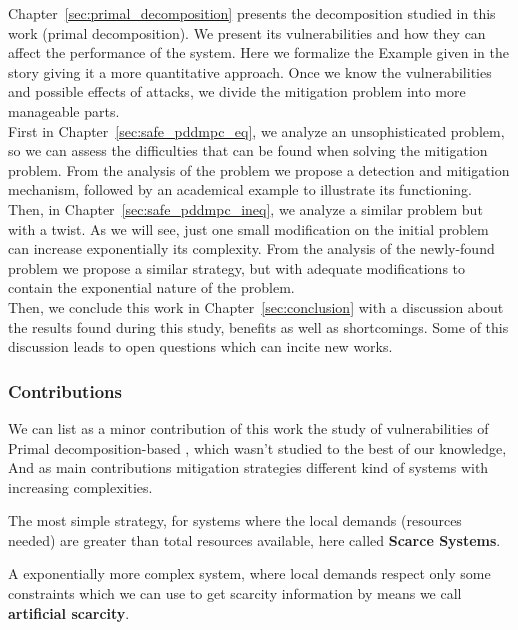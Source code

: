 \documentclass[../main.tex]{subfiles}
\begin{document}
Chapter~\ref{sec:primal_decomposition} presents the decomposition studied in this work (primal decomposition). We present its vulnerabilities and how they can affect the performance of the system. Here we formalize the Example given in the story giving it a more quantitative approach.
Once we know the vulnerabilities and possible effects of attacks, we divide the mitigation problem into more manageable parts.
\\ First in Chapter~\ref{sec:safe_pddmpc_eq}, we analyze an unsophisticated problem, so we can assess the difficulties that can be found when solving the mitigation problem. From the analysis of the problem we propose a detection and mitigation mechanism, followed by an academical example to illustrate its functioning.
\\Then, in Chapter~\ref{sec:safe_pddmpc_ineq}, we analyze a similar problem but with a twist. As we will see, just one small modification on the initial problem can increase exponentially its complexity.
From the analysis of the newly-found problem we propose a similar strategy, but with adequate modifications to contain the exponential nature of the problem.
\\Then, we conclude this work in Chapter~\ref{sec:conclusion} with a discussion about the results found during this study, benefits as well as shortcomings. Some of this discussion leads to open questions which can incite new works.

\subsubsection{Contributions}
We can list as a minor contribution of this work the study of vulnerabilities of Primal decomposition-based \dmpc{}, which wasn't studied to the best of our knowledge,
And as main contributions  mitigation strategies different kind of systems with increasing complexities.

The most simple strategy, for systems where the local demands (resources needed) are greater than total resources available, here called \textbf{Scarce Systems}.

A exponentially more complex system, where local demands respect only some constraints which we can use to get scarcity information by means we call \textbf{artificial scarcity}.
\end{document}
